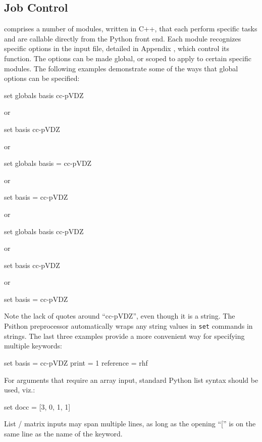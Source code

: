 \subsection{Job Control}
\PSIfour comprises a number of modules, written in C++, that each perform
specific tasks and are callable directly from the Python front end. Each module
recognizes specific options in the input file, detailed in Appendix \label{keywords}, which
control its function. The options can be made global, or scoped to apply to
certain specific modules. The following examples demonstrate some of the ways
that global options can be specified:
\begin{Snippet}
set globals basis cc-pVDZ

 or

set basis cc-pVDZ

 or

set globals basis = cc-pVDZ

 or

set basis = cc-pVDZ

 or

set globals{
  basis cc-pVDZ
}

 or

set{
  basis cc-pVDZ
}

 or

set{
  basis = cc-pVDZ
}
\end{Snippet}
Note the lack of quotes around ``cc-pVDZ'', even though it is a string. The
Psithon preprocessor automatically wraps any string values in {\tt set} commands in
strings. The last three examples provide a more convenient way for specifying
multiple keywords:
\begin{Snippet}
set{
  basis = cc-pVDZ
  print = 1
  reference = rhf
}
\end{Snippet}
For arguments that require an array input, standard Python list syntax should
be used, viz.:
\begin{Snippet}
set{
  docc = [3, 0, 1, 1]
}
\end{Snippet}
List / matrix inputs may span multiple lines, as long as the opening ``['' is
on the same line as the name of the keyword.

